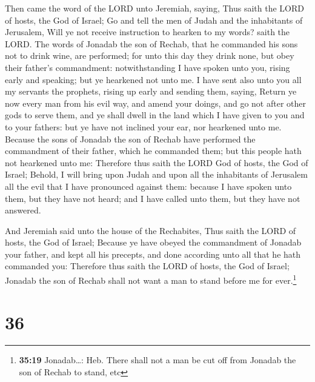  Then came the word of the LORD unto Jeremiah, saying,
 Thus saith the LORD of hosts, the God of Israel; Go and
tell the men of Judah and the inhabitants of Jerusalem, Will ye not
receive instruction to hearken to my words? saith the LORD.
 The words of Jonadab the son of Rechab, that he
commanded his sons not to drink wine, are performed; for unto this day
they drink none, but obey their father's commandment: notwithstanding I
have spoken unto you, rising early and speaking; but ye hearkened not
unto me.  I have sent also unto you all my servants the
prophets, rising up early and sending them, saying, Return ye now every
man from his evil way, and amend your doings, and go not after other
gods to serve them, and ye shall dwell in the land which I have given to
you and to your fathers: but ye have not inclined your ear, nor
hearkened unto me.  Because the sons of Jonadab the son
of Rechab have performed the commandment of their father, which he
commanded them; but this people hath not hearkened unto me:
 Therefore thus saith the LORD God of hosts, the God of
Israel; Behold, I will bring upon Judah and upon all the inhabitants of
Jerusalem all the evil that I have pronounced against them: because I
have spoken unto them, but they have not heard; and I have called unto
them, but they have not answered.

 And Jeremiah said unto the house of the Rechabites, Thus
saith the LORD of hosts, the God of Israel; Because ye have obeyed the
commandment of Jonadab your father, and kept all his precepts, and done
according unto all that he hath commanded you:  Therefore
thus saith the LORD of hosts, the God of Israel; Jonadab the son of
Rechab shall not want a man to stand before me for ever.\footnote{\textbf{35:19}
  Jonadab\ldots: Heb. There shall not a man be cut off from Jonadab the
  son of Rechab to stand, etc}

\hypertarget{section-35}{%
\section{36}\label{section-35}}

